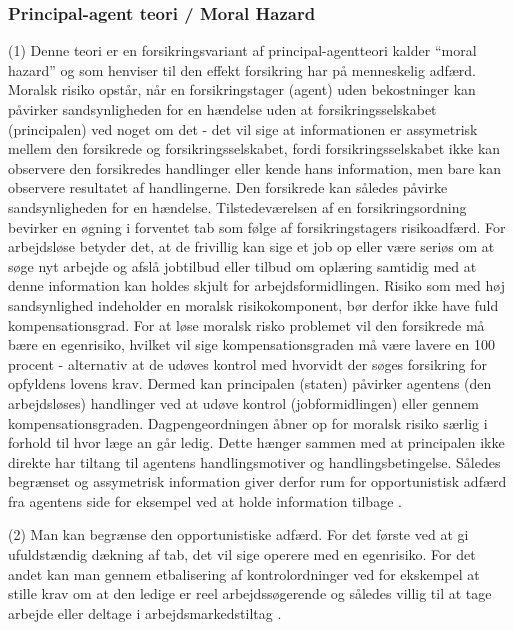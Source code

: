 \subsubsection{\textbf{Principal-agent teori / Moral Hazard} \parencite[29-31]{Halvorsen1999}}

(1) Denne teori er en forsikringsvariant af principal-agentteori kalder “moral hazard” og som henviser til den effekt forsikring har på menneskelig adfærd. Moralsk risiko opstår, når en forsikringstager (agent) uden bekostninger kan påvirker sandsynligheden for en hændelse uden at forsikringsselskabet (principalen) ved noget om det - det vil sige at informationen er assymetrisk mellem den forsikrede og forsikringsselskabet, fordi forsikringsselskabet ikke kan observere den forsikredes handlinger eller kende hans information, men bare kan observere resultatet af handlingerne. Den forsikrede kan således påvirke sandsynligheden for en hændelse. Tilstedeværelsen af en forsikringsordning bevirker en øgning i forventet tab som følge af forsikringstagers risikoadfærd. For arbejdsløse betyder det, at de frivillig kan sige et job op eller være seriøs om at søge nyt arbejde og afslå jobtilbud eller tilbud om oplæring samtidig med at denne information kan holdes skjult for arbejdsformidlingen. Risiko som med høj sandsynlighed indeholder en moralsk risikokomponent, bør derfor ikke have fuld kompensationsgrad. For at løse moralsk risko problemet vil den forsikrede må bære en egenrisiko, hvilket vil sige kompensationsgraden må være lavere en 100 procent - alternativ at de udøves kontrol med hvorvidt der søges forsikring for opfyldens lovens krav. Dermed kan principalen (staten) påvirker agentens (den arbejdsløses) handlinger ved at udøve kontrol (jobformidlingen) eller gennem kompensationsgraden. Dagpengeordningen åbner op for moralsk risiko særlig i forhold til hvor læge an går ledig. Dette hænger sammen med at principalen ikke direkte har tiltang til agentens handlingsmotiver og handlingsbetingelse. Således begrænset og assymetrisk information giver derfor rum for opportunistisk adfærd fra agentens side for eksempel ved at holde information tilbage \parencite[29-30]{Halvorsen1999}.

(2) Man kan begrænse den opportunistiske adfærd. For det første ved at gi ufuldstændig dækning af tab, det vil sige operere med en egenrisiko. For det andet kan man gennem etbalisering af kontrolordninger ved for ekskempel at stille krav om at den ledige er reel arbejdssøgerende og således villig til at tage arbejde eller deltage i arbejdsmarkedstiltag \parencite[29-30]{Halvorsen1999}. 


